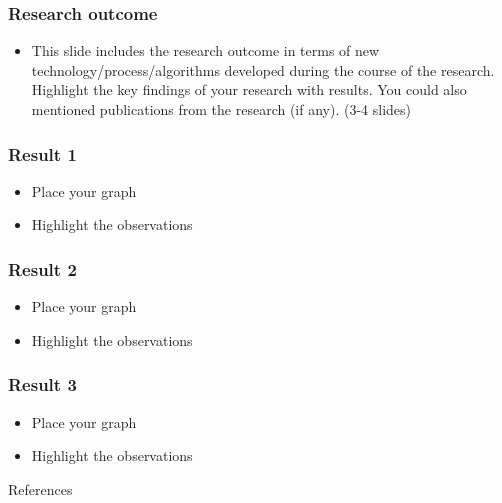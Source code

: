 \documentclass{beamer}
\begin{document}
\begin{frame}\frametitle{Research outcome}
\begin{itemize}
\item This slide includes the research outcome in terms of new technology/process/algorithms developed during the course of the research. Highlight the key findings of your research with results. You could also mentioned publications from the research (if any). (3-4 slides)
\end{itemize}
\end{frame}


\begin{frame}\frametitle{Result 1}
\begin{itemize}
\item Place your graph
\item Highlight the observations
\end{itemize}
\end{frame}

\begin{frame}\frametitle{Result 2}
\begin{itemize}
\item Place your graph
\item Highlight the observations
\end{itemize}
\end{frame}

\begin{frame}\frametitle{Result 3}
\begin{itemize}
\item Place your graph
\item Highlight the observations
\end{itemize}
\end{frame}

\begin{frame}[allowframebreaks]{References}

\nocite{*}
\end{frame}
\end{document}

